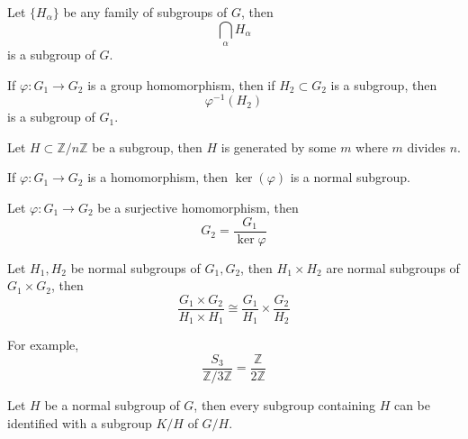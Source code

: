 \documentclass[openany]{book}
\newcommand{\Z}{\mathbb{Z}}
\begin{document}
\begin{prop}
    Let $\{H_\alpha\}$ be any family of subgroups of $G$, then 
    \begin{equation*}
        \bigcap_\alpha H_\alpha
    \end{equation*}
    is a subgroup of $G$.
\end{prop}

\begin{prop}
    If $\varphi: G_1\to G_2$ is a group homomorphism, then if $H_2\subset G_2$ is a subgroup, then 
    \begin{equation*}
        \varphi^{-1}(H_2)
    \end{equation*}
    is a subgroup of $G_1$.
\end{prop}

\begin{prop}
    Let $H\subset\Z/n\Z$ be a subgroup, then $H$ is generated by some $m$ where $m$ divides $n$.
\end{prop}


\begin{prop}
    If $\varphi: G_1\to G_2$ is a homomorphism, then $\ker(\varphi)$ is a normal subgroup.
\end{prop}


\begin{thm}
    Let $\varphi:G_1\to G_2$ be a surjective homomorphism, then 
    \begin{equation*}
        G_2=\frac{G_1}{\ker\varphi}
    \end{equation*}
\end{thm}

\begin{prop}
    Let $H_1,H_2$ be normal subgroups of $G_1,G_2$, then $H_1\times H_2$ are normal subgroups of $G_1\times G_2$, then 
    \begin{equation*}
        \frac{G_1\times G_2}{H_1\times H_1}\cong\frac{G_1}{H_1}\times\frac{G_2}{H_2}
    \end{equation*}

    For example, 
    \begin{equation*}
        \frac{S_3}{\Z/3\Z}=\frac{\Z}{2\Z}
    \end{equation*}
\end{prop}

\begin{prop}
    Let $H$ be a normal subgroup of $G$, then every subgroup containing $H$ can be identified with a subgroup $K/H$ of $G/H$.
\end{prop}
\end{document}
